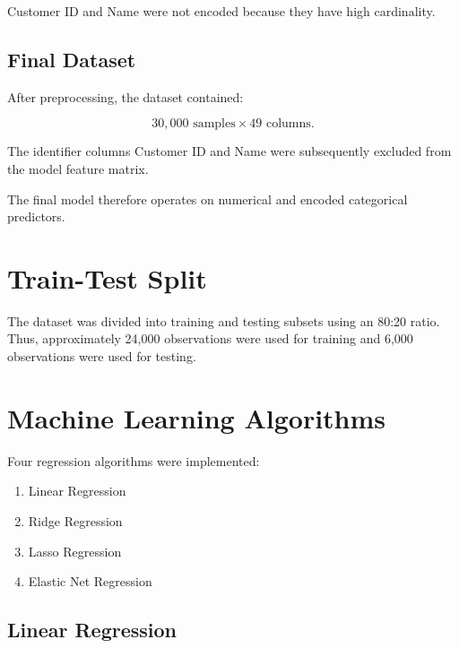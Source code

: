\documentclass[12pt,a4paper]{article}
\begin{document}
Customer ID and Name were not encoded because they have high cardinality.

\subsection{Final Dataset}

After preprocessing, the dataset contained:

\[
30,000 \text{ samples} \times 49 \text{ columns}.
\]

The identifier columns Customer ID and Name were subsequently excluded
from the model feature matrix.

The final model therefore operates on numerical and encoded categorical
predictors.


\section{Train-Test Split}

The dataset was divided into training and testing subsets using an
80:20 ratio.
Thus, approximately 24,000 observations were used for training and
6,000 observations were used for testing.


\section{Machine Learning Algorithms}

Four regression algorithms were implemented:

\begin{enumerate}
    \item Linear Regression
    \item Ridge Regression
    \item Lasso Regression
    \item Elastic Net Regression
\end{enumerate}

\subsection{Linear Regression}
\end{document}
